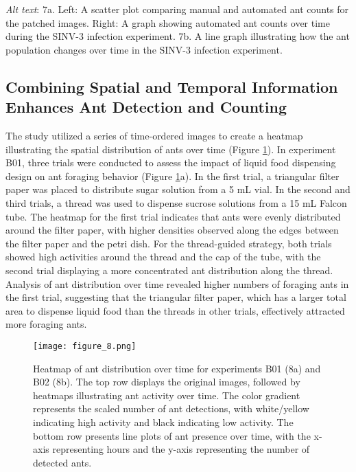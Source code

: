 \textit{Alt text}: 7a. Left: A scatter plot comparing manual and automated ant counts for the patched images. Right: A graph showing automated ant counts over time during the SINV-3 infection experiment. 7b. A line graph illustrating how the ant population changes over time in the SINV-3 infection experiment.

\subsection{Combining Spatial and Temporal Information Enhances Ant Detection and Counting}

The study utilized a series of time-ordered images to create a heatmap illustrating the spatial distribution of ants over time (Figure \ref{fig:figure8}). In experiment B01, three trials were conducted to assess the impact of liquid food dispensing design on ant foraging behavior (Figure \ref{fig:figure8}a). In the first trial, a triangular filter paper was placed to distribute sugar solution from a 5 mL vial. In the second and third trials, a thread was used to dispense sucrose solutions from a 15 mL Falcon tube. The heatmap for the first trial indicates that ants were evenly distributed around the filter paper, with higher densities observed along the edges between the filter paper and the petri dish. For the thread-guided strategy, both trials showed high activities around the thread and the cap of the tube, with the second trial displaying a more concentrated ant distribution along the thread. Analysis of ant distribution over time revealed higher numbers of foraging ants in the first trial, suggesting that the triangular filter paper, which has a larger total area to dispense liquid food than the threads in other trials, effectively attracted more foraging ants.

\begin{figure}[H]
    \centering
    \texttt{[image: figure\_8.png]}
    \caption{Heatmap of ant distribution over time for experiments B01 (8a) and B02 (8b). The top row displays the original images, followed by heatmaps illustrating ant activity over time. The color gradient represents the scaled number of ant detections, with white/yellow indicating high activity and black indicating low activity. The bottom row presents line plots of ant presence over time, with the x-axis representing hours and the y-axis representing the number of detected ants.}
    \label{fig:figure8}
\end{figure}

